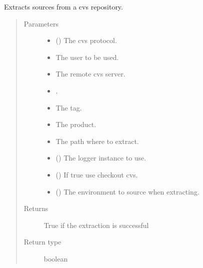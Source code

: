 \documentclass[a4paper,10pt,english]{sphinxmanual}
\begin{document}

\begin{fulllineitems}
\label{\detokenize{commands/apidoc/src:src.system.cvs_extract}}
Extracts sources from a cvs repository.
\begin{quote}\begin{description}
\item[{Parameters}] \leavevmode\begin{itemize}
\item {} 
 () \textendash{} The cvs protocol.

\item {} 
 \textendash{} The user to be used.

\item {} 
 \textendash{} The remote cvs server.

\item {} 
 \textendash{} 
.


\item {} 
 \textendash{} The tag.

\item {} 
 \textendash{} The product.

\item {} 
 \textendash{} The path where to extract.

\item {} 
 () \textendash{} The logger instance to use.

\item {} 
 () \textendash{} If true use checkout cvs.

\item {} 
 () \textendash{} The environment to source when
extracting.

\end{itemize}

\item[{Returns}] \leavevmode
True if the extraction is successful

\item[{Return type}] \leavevmode
boolean

\end{description}\end{quote}

\end{fulllineitems}
\end{document}
